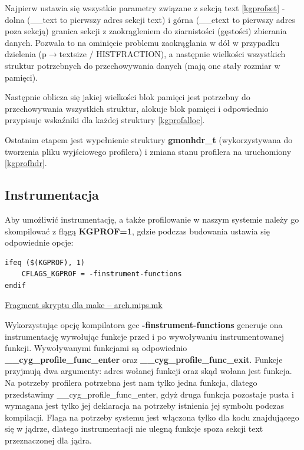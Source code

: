 \documentclass[shortabstract]{iithesis}
\theoremstyle{definition} \newtheorem*{definition}{Definicja}
\theoremstyle{definition} \newtheorem*{example}{Przykład}
\theoremstyle{definition} \newtheorem*{remark}{Uwaga}
\newenvironment{longlisting}{\captionsetup{type=listing}}{}
\begin{document}
Najpierw ustawia się wszystkie parametry związane z sekcją text \ref{kgprofset} -  dolna (\_\_text to pierwszy adres sekcji text) i górna (\_\_etext to pierwszy adres poza sekcją)  granica sekcji z zaokrągleniem do ziarnistości (gęstości) zbierania danych. Pozwala to na ominięcie problemu zaokrąglania w dół w przypadku dzielenia (p$\rightarrow$textsize / HISTFRACTION), a następnie wielkości wszystkich struktur potrzebnych do przechowywania danych (mają one stały rozmiar w pamięci).

Następnie oblicza się jakiej wielkości blok pamięci jest potrzebny do przechowywania wszystkich struktur, alokuje blok pamięci i odpowiednio przypisuje wskaźniki dla każdej struktury \ref{kgprofalloc}.

Ostatnim etapem jest wypełnienie struktury \textbf{gmonhdr\_t} (wykorzystywana do tworzenia pliku wyjściowego profilera) i zmiana stanu profilera na uruchomiony \ref{kgprofhdr}.

\subsection{Instrumentacja}

Aby umożliwić instrumentację, a także profilowanie w naszym systemie należy go skompilować z flągą \textbf{KGPROF=1}, gdzie podczas budowania ustawia się odpowiednie opcje:


\begin{longlisting}
  \begin{verbatim}
ifeq ($(KGPROF), 1)
    CFLAGS_KGPROF = -finstrument-functions
endif
  \end{verbatim}
  \caption{\href{https://mimiker.ii.uni.wroc.pl/source/xref/mimiker/build/arch.mips.mk?r=27b8c19a\#28}{Fragment skryptu dla make -- arch.mips.mk}}
  \label{lst:makefile}
\end{longlisting}

Wykorzystując opcję kompilatora gcc \textbf{-finstrument-functions} \cite{bib:gccflags} generuje ona instrumentację wywołując funkcje przed i po wywoływaniu instrumentowanej funkcji. Wywoływanymi funkcjami są odpowiednio  \textbf{\_\_cyg\_profile\_func\_enter} oraz  \textbf{\_\_cyg\_profile\_func\_exit}. Funkcje przyjmują dwa argumenty: adres wołanej funkcji oraz skąd wołana jest funkcja. Na potrzeby profilera potrzebna jest nam tylko jedna funkcja, dlatego przedstawimy \_\_cyg\_profile\_func\_enter, gdyż druga funkcja pozostaje pusta i wymagana jest tylko jej deklaracja na potrzeby istnienia jej symbolu podczas kompilacji. Flaga na potrzeby systemu jest włączona tylko dla kodu znajdującego się w jądrze, dlatego instrumentacji nie ulegną funkcje spoza sekcji text przeznaczonej dla jądra.
\end{document}
